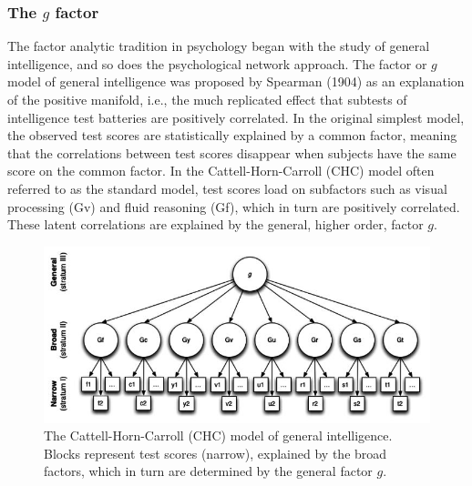 \documentclass[
  a4paper,
  DIV=11,
  numbers=noendperiod]{scrreprt}
\begin{document}
\hypertarget{sec-The-g-factor}{%
\subsubsection{\texorpdfstring{The \(g\)
factor}{The g factor}}\label{sec-The-g-factor}}

The factor analytic tradition in psychology began with the study of
general intelligence, and so does the psychological network approach.
The factor or \(g\) model of general intelligence was proposed by
Spearman (1904) as an explanation of the positive manifold, i.e., the
much replicated effect that subtests of intelligence test batteries are
positively correlated. In the original simplest model, the observed test
scores are statistically explained by a common factor, meaning that the
correlations between test scores disappear when subjects have the same
score on the common factor. In the Cattell-Horn-Carroll (CHC) model
often referred to as the standard model, test scores load on subfactors
such as visual processing (Gv) and fluid reasoning (Gf), which in turn
are positively correlated. These latent correlations are explained by
the general, higher order, factor \(g\).

\begin{figure}

{\centering \includegraphics{media/ch6/image4.jpg}

}

\caption{\label{fig-ch6-img4-old-73}The Cattell-Horn-Carroll (CHC) model
of general intelligence. Blocks represent test scores (narrow),
explained by the broad factors, which in turn are determined by the
general factor \(g\).}

\end{figure}
\end{document}
